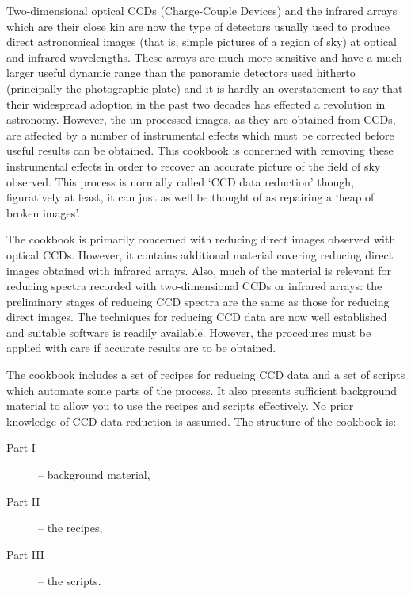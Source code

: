 \documentclass[twoside,11pt]{starlink}
\begin{document}
Two-dimensional optical CCDs (Charge-Couple Devices) and the infrared
arrays which are their close kin are now the type of detectors usually
used to produce direct astronomical images (that is, simple pictures
of a region of sky) at optical and infrared wavelengths.  These arrays
are much more sensitive and have a much larger useful dynamic range
than the panoramic detectors used hitherto (principally the photographic
plate) and it is hardly an overstatement to say that their widespread
adoption in the past two decades has effected a revolution in astronomy.
However, the un-processed images, as they are obtained from CCDs, are
affected by a number of instrumental effects which must be corrected before
useful results can be obtained.  This cookbook is concerned with removing
these instrumental effects in order to recover an accurate picture of the
field of sky observed.  This process is normally called `CCD data reduction'
though, figuratively at least, it can just as well be thought of as
repairing a `heap of broken images'.

The cookbook is primarily concerned with reducing direct images observed
with optical CCDs.  However, it contains additional material covering
reducing direct images obtained with infrared arrays.  Also, much of the
material is relevant for reducing spectra recorded with two-dimensional
CCDs or infrared arrays: the preliminary stages of reducing CCD spectra
are the same as those for reducing direct images.  The techniques for
reducing CCD data are now well established and suitable software is
readily available.  However, the procedures must be applied with care if
accurate results are to be obtained.

The cookbook includes a set of recipes for reducing CCD data and a set
of scripts which automate some parts of the process.  It also presents
sufficient background material to allow you to use the recipes and scripts
effectively.  No prior knowledge of CCD data reduction is assumed.  The
structure of the cookbook is:

\begin{description}

  \item[{\rm Part I}] -- background material,

  \item[{\rm Part II}] -- the recipes,

  \item[{\rm Part III}] -- the scripts.

\end{description}
\end{document}
